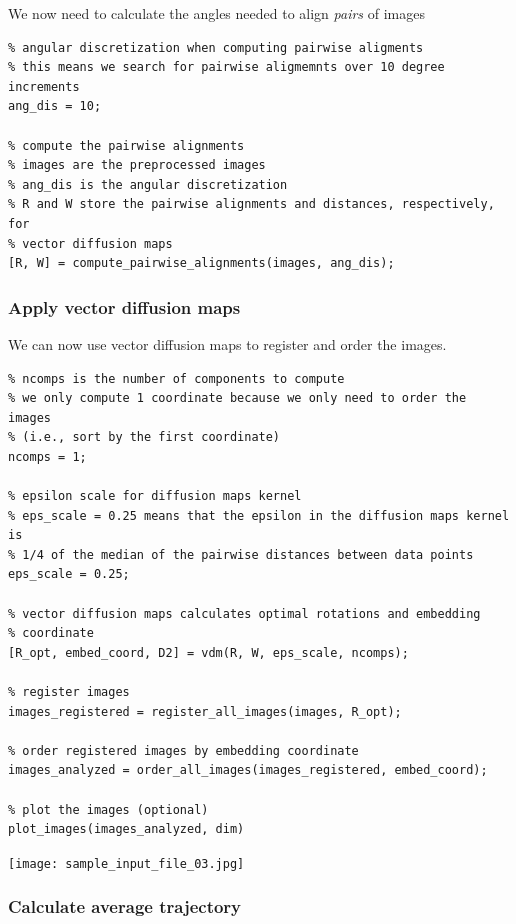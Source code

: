 \documentclass[12pt]{article}
\begin{document}
\begin{par}
We now need to calculate the angles needed to align \textit{pairs} of images
\end{par} \vspace{1em}
\begin{verbatim}
% angular discretization when computing pairwise aligments
% this means we search for pairwise aligmemnts over 10 degree increments
ang_dis = 10;

% compute the pairwise alignments
% images are the preprocessed images
% ang_dis is the angular discretization
% R and W store the pairwise alignments and distances, respectively, for
% vector diffusion maps
[R, W] = compute_pairwise_alignments(images, ang_dis);
\end{verbatim}


\subsubsection{Apply vector diffusion maps}

\begin{par}
We can now use vector diffusion maps to register and order the images.
\end{par} \vspace{1em}
\begin{verbatim}
% ncomps is the number of components to compute
% we only compute 1 coordinate because we only need to order the images
% (i.e., sort by the first coordinate)
ncomps = 1;

% epsilon scale for diffusion maps kernel
% eps_scale = 0.25 means that the epsilon in the diffusion maps kernel is
% 1/4 of the median of the pairwise distances between data points
eps_scale = 0.25;

% vector diffusion maps calculates optimal rotations and embedding
% coordinate
[R_opt, embed_coord, D2] = vdm(R, W, eps_scale, ncomps);

% register images
images_registered = register_all_images(images, R_opt);

% order registered images by embedding coordinate
images_analyzed = order_all_images(images_registered, embed_coord);

% plot the images (optional)
plot_images(images_analyzed, dim)
\end{verbatim}

\texttt{[image: sample\_input\_file\_03.jpg]}

\subsubsection{Calculate average trajectory}
\end{document}
